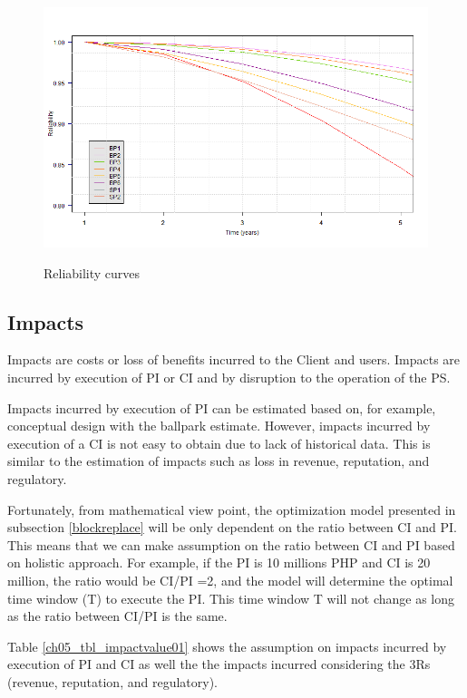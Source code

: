 \begin{figure}[!htb]
	\includegraphics[width=\textwidth]{figures/ch05_fig_reliability01} \\
	\caption{Reliability curves}
	\label{ch05_fig_reliability01} 
\end{figure}


\subsection{Impacts}
Impacts are costs or loss of benefits incurred to the Client and users. Impacts are incurred by execution of PI or CI and by disruption to the operation of the PS. 

Impacts incurred by execution of PI can be estimated based on, for example, conceptual design with the ballpark estimate. However, impacts incurred by execution of a CI is not easy to obtain due to lack of historical data. This is similar to the estimation of impacts such as loss in revenue, reputation, and regulatory. 

Fortunately, from mathematical view point, the optimization model presented in subsection \ref{blockreplace} will be only dependent on the ratio between CI and PI. This means that we can make assumption on the ratio between CI and PI based on holistic approach. For example, if the PI is 10 millions PHP and CI is 20 million, the ratio would be CI/PI =2, and the model will determine the optimal time window (T) to execute the PI. This time window T will not change as long as the ratio between CI/PI is the same. 

Table \ref{ch05_tbl_impactvalue01} shows the assumption on impacts incurred by execution of PI and CI as well the the impacts incurred considering the 3Rs (revenue, reputation, and regulatory). 

